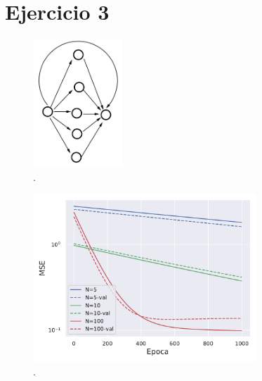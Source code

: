 \section*{Ejercicio 3}
\graphicspath{{Figuras/}}

\begin{figure}[h!]
    \centering
    \includegraphics[width=0.3\textwidth]{Figuras/ejer_3.png}
    \caption{.}
    \label{03:fig:Arquitectura}
\end{figure}

\begin{figure}[h!]
    \centering
    \includegraphics[width=0.75\textwidth]{Figuras/ej3/Loss.pdf}
    \caption{.}
    \label{03:fig:Resultados}
\end{figure}




